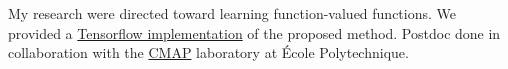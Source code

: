 \documentclass[10pt]{article} %
\begin{document}
\begin{paracol}{2}
{My research were directed toward learning function-valued functions. We
provided a  \href{https://bitbucket.org/RomainBrault/itl/}{Tensorflow
implementation} of the proposed method. Postdoc done in collaboration
with the \href{https://portail.polytechnique.edu/cmap/fr}{CMAP} laboratory at
\'Ecole Polytechnique.  }\par %
%
%

\end{paracol}
\end{document}
